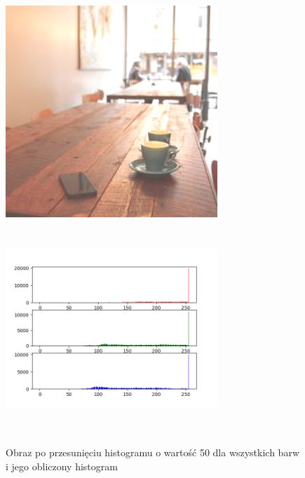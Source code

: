 \documentclass[a4paper,12pt]{book}
\begin{document}
\begin{figure}[H]
	\caption{Obraz po przesunięciu histogramu o wartość 50 dla wszystkich barw i jego obliczony histogram}
	\includegraphics[width=8cm, height=8cm]{6-2/move-histogram-image-coffee-(50,50,50).png}
	\includegraphics[width=8cm, height=8cm]{6-2/move-histogram-coffee-(50,50,50).png}
\end{figure}
\end{document}
